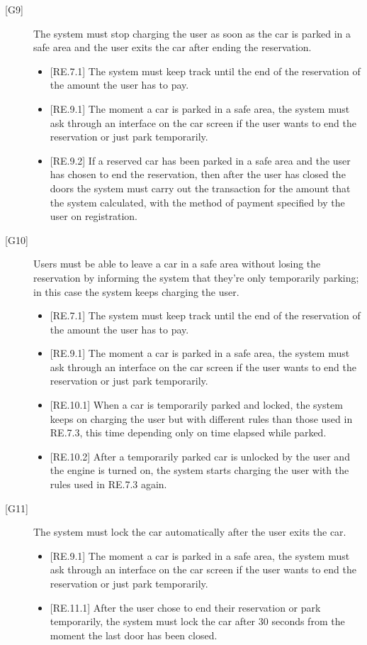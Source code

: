 \documentclass[english]{article}
\begin{document}
\begin{description}
\item[{[G9]}]{The system must stop charging the user as soon as the car is parked in a safe area and the user exits the car after ending the reservation.
\begin{itemize}
	\item{[RE.7.1] The system must keep track until the end of the reservation of the amount the user has to pay.}
	\item{[RE.9.1] The moment a car is parked in a safe area, the system must ask through an interface on the car screen if the user wants to end the reservation or just park temporarily.}
	\item{[RE.9.2] If a reserved car has been parked in a safe area and the user has chosen to end the reservation, then after the user has closed the doors the system must carry out the transaction for the amount that the system calculated, with the method of payment specified by the user on registration.}
\end{itemize}
}

\item[{[G10]}]{Users must be able to leave a car in a safe area without losing the reservation by informing the system that they’re only temporarily parking; in this case the system keeps charging the user.
\begin{itemize}
	\item{[RE.7.1] The system must keep track until the end of the reservation of the amount the user has to pay.}
	\item{[RE.9.1] The moment a car is parked in a safe area, the system must ask through an interface on the car screen if the user wants to end the reservation or just park temporarily.}
	\item{[RE.10.1] When a car is temporarily parked and locked, the system keeps on charging the user but with different rules than those used in RE.7.3, this time depending only on time elapsed while parked.}
	\item{[RE.10.2] After a temporarily parked car is unlocked by the user and the engine is turned on, the system starts charging the user with the rules used in RE.7.3 again.}
\end{itemize}
}

\item[{[G11]}]{The system must lock the car automatically after the user exits the car.
\begin{itemize}
	\item{[RE.9.1] The moment a car is parked in a safe area, the system must ask through an interface on the car screen if the user wants to end the reservation or just park temporarily.}
	\item{[RE.11.1] After the user chose to end their reservation or park temporarily, the system must lock the car after 30 seconds from the moment the last door has been closed.}
\end{itemize}
}


\end{description}
\end{document}

